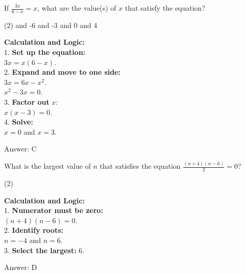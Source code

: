 \documentclass[11pt,paper=a4,answers]{exam}
\begin{document}
\begin{questions}
\question
If $\frac{3x}{6-x} = x$, what are the value(s) of $x$ that satisfy the equation?
\begin{tasks}(2)
     and -6
     and -3
     and 0
     and 4
\end{tasks}

\begin{solution}
\textbf{Calculation and Logic:} \\
1. \textbf{Set up the equation:} \\
$3x = x(6-x)$. \\
2. \textbf{Expand and move to one side:} \\
$3x = 6x - x^2$. \\
$x^2 - 3x = 0$. \\
3. \textbf{Factor out } $x$: \\
$x(x - 3) = 0$. \\
4. \textbf{Solve:} \\
$x = 0$ and $x = 3$.

\vspace{30pt}

Answer: \colorbox{yellow!100}{C}
\end{solution}

\vspace{60pt}

\question
What is the largest value of $n$ that satisfies the equation $\frac{(n+4)(n-6)}{2} = 0$?
\begin{tasks}(2)
\end{tasks}

\begin{solution}
\textbf{Calculation and Logic:} \\
1. \textbf{Numerator must be zero:} \\
$(n+4)(n-6) = 0$. \\
2. \textbf{Identify roots:} \\
$n = -4$ and $n = 6$. \\
3. \textbf{Select the largest:} 6.

\vspace{30pt}

Answer: \colorbox{yellow!100}{D}
\end{solution}

\vspace{60pt}


\end{questions}
\end{document}
